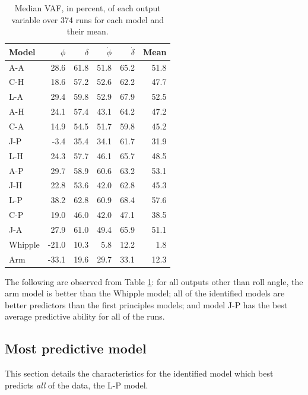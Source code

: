 \documentclass[a4paper]{article}
\begin{document}
\begin{table}
  \centering
  \caption{Median VAF, in percent,  of each output variable over 374 runs for
  each model and their mean.}
  \footnotesize
  \begin{tabular}{lrrrrr}
    \toprule
    Model   & $\phi$   & $\delta$ & $\dot{\phi}$ & $\dot{\delta}$ & Mean   \\
    \midrule
    A-A     & 28.6   & 61.8   & 51.8      & 65.2          & 51.8 \\
    C-H     & 18.6   & 57.2   & 52.6      & 62.2          & 47.7 \\
    L-A     & 29.4   & 59.8   & 52.9      & 67.9          & 52.5 \\
    A-H     & 24.1   & 57.4   & 43.1      & 64.2          & 47.2 \\
    C-A     & 14.9   & 54.5   & 51.7      & 59.8          & 45.2 \\
    J-P     & -3.4   & 35.4   & 34.1      & 61.7          & 31.9 \\
    L-H     & 24.3   & 57.7   & 46.1      & 65.7          & 48.5 \\
    A-P     & 29.7   & 58.9   & 60.6      & 63.2          & 53.1 \\
    J-H     & 22.8   & 53.6   & 42.0      & 62.8          & 45.3 \\
    L-P     & 38.2   & 62.8   & 60.9      & 68.4          & 57.6 \\
    C-P     & 19.0   & 46.0   & 42.0      & 47.1          & 38.5 \\
    J-A     & 27.9   & 61.0   & 49.4      & 65.9          & 51.1 \\
    Whipple & -21.0  & 10.3   & 5.8       & 12.2          &  1.8 \\
    Arm     & -33.1  & 19.6   & 29.7      & 33.1          & 12.3 \\
    \bottomrule
  \end{tabular}
  \label{tab:MedianVAFOutputs}
\end{table}

The following are observed from Table \ref{tab:MedianVAFOutputs}: for all
outputs other than roll angle, the arm model is better than the Whipple model;
all of the identified models are better predictors than the first principles
models; and model J-P has the best average predictive ability for all of the
runs.

\subsection*{Most predictive model}
This section details the characteristics for the identified model which best
predicts \emph{all} of the data, the L-P model.
\end{document}
